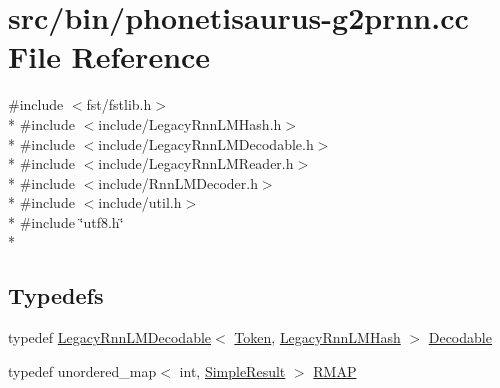 \hypertarget{phonetisaurus-g2prnn_8cc}{}\section{src/bin/phonetisaurus-\/g2prnn.cc File Reference}
\label{phonetisaurus-g2prnn_8cc}
{\ttfamily \#include $<$fst/fstlib.\+h$>$}\\*
{\ttfamily \#include $<$include/\+Legacy\+Rnn\+L\+M\+Hash.\+h$>$}\\*
{\ttfamily \#include $<$include/\+Legacy\+Rnn\+L\+M\+Decodable.\+h$>$}\\*
{\ttfamily \#include $<$include/\+Legacy\+Rnn\+L\+M\+Reader.\+h$>$}\\*
{\ttfamily \#include $<$include/\+Rnn\+L\+M\+Decoder.\+h$>$}\\*
{\ttfamily \#include $<$include/util.\+h$>$}\\*
{\ttfamily \#include \char`\"{}utf8.\+h\char`\"{}}\\*
\subsection*{Typedefs}
\begin{DoxyCompactItemize}
\item 
typedef \hyperlink{class_legacy_rnn_l_m_decodable}{Legacy\+Rnn\+L\+M\+Decodable}$<$ \hyperlink{class_token}{Token}, \hyperlink{class_legacy_rnn_l_m_hash}{Legacy\+Rnn\+L\+M\+Hash} $>$ \hyperlink{phonetisaurus-g2prnn_8cc_a43ce4eb8f370c5b37f80c5bb5f1b4e16}{Decodable}
\item 
typedef unordered\+\_\+map$<$ int, \hyperlink{class_simple_result}{Simple\+Result} $>$ \hyperlink{phonetisaurus-g2prnn_8cc_a7b96401d634bcd97a67f2a841418f174}{R\+M\+AP}
\end{DoxyCompactItemize}
